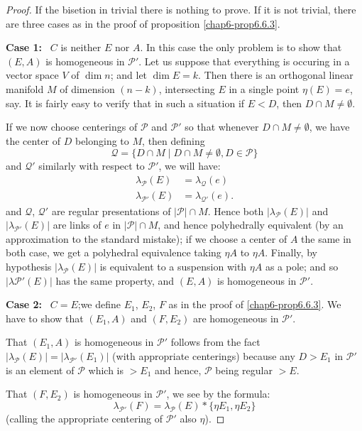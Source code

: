 \begin{proof}
If the bisetion in trivial there is nothing to prove. If it is not trivial, there are three cases as in the proof of proposition \ref{chap6-prop6.6.3}.

\medskip
\noindent
{\bf Case 1:}~ $C$ is neither $E$ nor $A$. In this case the only problem is to show that $(E,A)$ is homogeneous in $\mathscr{P}'$. Let us suppose that everything is occuring in a vector space $V$ of $\dim n$; and let $\dim E=k$. Then there is an orthogonal linear manifold $M$ of dimension $(n-k)$, intersecting $E$ in a single point $\eta(E)=e$, say. It is fairly easy to verify that in such a situation if $E<D$, then $D\cap M\neq \emptyset$.

If we now choose centerings of $\mathscr{P}$ and $\mathscr{P}'$ so that whenever $D\cap M\neq \emptyset$, we have the center of $D$ belonging to $M$, then defining
$$
\mathcal{Q}=\{D\cap M\mid D\cap M\neq \emptyset, D\in \mathscr{P}\}
$$
and $\mathcal{Q}'$ similarly with respect to $\mathscr{P}'$, we will have:
\begin{align*}
\lambda_{\mathscr{P}}(E) &= \lambda_{\mathcal{Q}}(e)\\
\lambda_{\mathscr{P}'}(E) &= \lambda_{\mathcal{Q}'}(e).
\end{align*}
and $\mathcal{Q}$, $\mathcal{Q}'$ are regular presentations of $|\mathscr{P}|\cap M$. Hence both $|\lambda_{\mathscr{P}}(E)|$ and $|\lambda_{\mathscr{P}'}(E)|$ are links of $e$ in $|\mathscr{P}|\cap M$, and hence polyhedrally equivalent (by an approximation to the standard mistake); if we choose a center of $A$ the same in both case, we get a polyhedral equivalence taking $\eta A$ to $\eta A$. Finally, by hypothesis $|\lambda_{\mathscr{P}}(E)|$ is equivalent to a suspension with $\eta A$ as a pole; and so $|\lambda \mathscr{P}'(E)|$ has the same property, and $(E,A)$ is homogeneous in $\mathscr{P}'$.

\medskip
\noindent
{\bf Case 2:}~ $C=E$;\pageoriginale we define $E_{1}$, $E_{2}$, $F$ as in the proof of \ref{chap6-prop6.6.3}. We have to show that $(E_{1},A)$ and $(F,E_{2})$ are homogeneous in $\mathscr{P}'$.

That $(E_{1},A)$ is homogeneous in $\mathscr{P}'$ follows from the fact $|\lambda_{\mathscr{P}}(E)|=|\lambda_{\mathscr{P}'}(E_{1})|$ (with appropriate centerings) because any $D>E_{1}$ in $\mathscr{P}'$ is an element of $\mathscr{P}$ which is $>E_{1}$ and hence, $\mathscr{P}$ being regular $>E$.

That $(F,E_{2})$ is homogeneous in $\mathscr{P}'$, we see by the formula:
$$
\lambda_{\mathscr{P}'}(F)=\lambda_{\mathscr{P}}(E)\ast \{\eta E_{1},\eta E_{2}\}
$$
(calling the appropriate centering of $\mathscr{P}'$ also $\eta$).


\end{proof}
